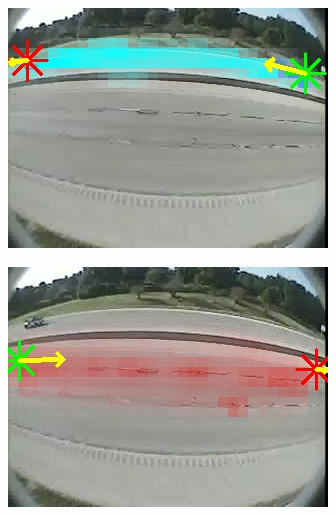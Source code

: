 \begin{figure}
    \centering
        \begin{subfigure}{0.32\linewidth}
            \includegraphics[width=\linewidth]{./img/scene_learning/res/252707/252707-0.jpg}
        \end{subfigure}
        \begin{subfigure}{0.32\linewidth}
            \includegraphics[width=\linewidth]{./img/scene_learning/res/252707/252707-1.jpg}
        \end{subfigure}
        \begin{subfigure}{0.32\linewidth}

\end{subfigure}
\end{figure}
